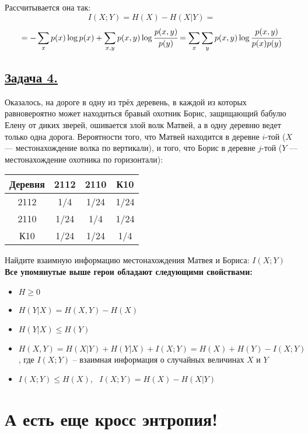 Рассчитывается она так:
\[I(X; Y)=H(X)-H(X|Y)=\]
\[=-\sum\limits_{x} p(x)\log p(x) +\sum\limits_{x, y} p(x, y)\log \cfrac{p(x, y)}{p(y)} =
\sum\limits_{x}\sum\limits_{y} p(x, y)\log \cfrac{p(x, y)}{p(x)p(y)} \]

\subsection*{\hyperref[sec:sol_problem4]{Задача 4.}}\label{sec:problem4}  Оказалось, на дороге в одну из трёх деревень, в каждой из которых равновероятно может находиться бравый охотник Борис, защищающий бабулю Елену от диких зверей, ошивается злой волк Матвей, а в одну деревню ведет только одна дорога. Вероятности того, что Матвей находится в деревне $i$-той ($X$ --- местонахождение волка по вертикали), и того, что Борис в деревне $j$-той ($Y$ --- местонахождение охотника по горизонтали):
\begin{center}
    \begin{tabular}{c||c|c|c}
        Деревня & 2112 & 2110 & К10 \\
        \hline
        \hline
        2112 & 1/4 & 1/24 & 1/24 \\
        \hline
        2110 & 1/24 & 1/4 & 1/24 \\
        \hline
        К10 & 1/24 & 1/24 & 1/4 \\
    \end{tabular}
\end{center}

Найдите взаимную информацию местонахождения Матвея и Бориса: $I(X; Y)$
\\

\textbf{Все упомянутые выше герои обладают следующими свойствами:}

\begin{itemize}
	\item $H \geqslant 0$
	\item $H(Y|X)=H(X, Y)-H(X)$ 
	\item $H(Y|X)\leqslant H(Y)$
	\item $H(X, Y)=H(X|Y)+H(Y|X)+I(X; Y)=H(X)+H(Y)-I(X; Y)$, где $I(X; Y)$ -- взаимная информация о случайных величинах $X$ и $Y$
	\item $I(X; Y)\leqslant H(X)$, \ $I(X; Y)=H(X)-H(X|Y)$
\end{itemize}

\section*{А есть еще кросс энтропия!}~\
\\

